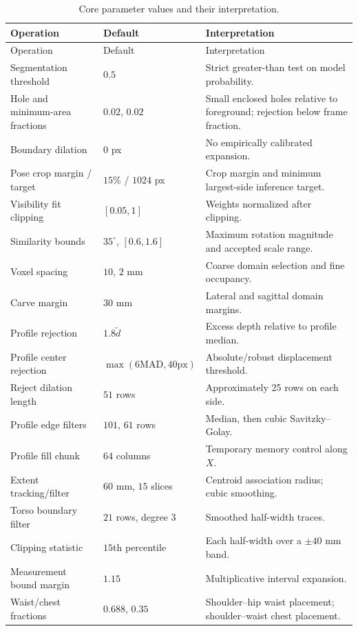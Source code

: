 \begin{longtable}{p{4.7cm}p{3.1cm}p{6.9cm}}
\caption{Core parameter values and their interpretation.}\label{tab:parameters}\\
\toprule
Operation & Default & Interpretation \\
\midrule
\endfirsthead
\toprule Operation & Default & Interpretation \\
\midrule
\endhead
\bottomrule\endfoot
Segmentation threshold & $0.5$ & Strict greater-than test on model probability. \\
Hole and minimum-area fractions & $0.02$, $0.02$ & Small enclosed holes relative to foreground; rejection below frame fraction. \\
Boundary dilation & $0$ px & No empirically calibrated expansion. \\
Pose crop margin / target & $15\%$ / $1024$ px & Crop margin and minimum largest-side inference target. \\
Visibility fit clipping & $[0.05,1]$ & Weights normalized after clipping. \\
Similarity bounds & $35^\circ$, $[0.6,1.6]$ & Maximum rotation magnitude and accepted scale range. \\
Voxel spacing & $10$, $2$ mm & Coarse domain selection and fine occupancy. \\
Carve margin & $30$ mm & Lateral and sagittal domain margins. \\
Profile rejection & $1.8\widetilde d$ & Excess depth relative to profile median. \\
Profile center rejection & $\max(6\mathrm{MAD},40\mathrm{px})$ & Absolute/robust displacement threshold. \\
Reject dilation length & $51$ rows & Approximately 25 rows on each side. \\
Profile edge filters & $101$, $61$ rows & Median, then cubic Savitzky--Golay. \\
Profile fill chunk & $64$ columns & Temporary memory control along $X$. \\
Extent tracking/filter & $60$ mm, $15$ slices & Centroid association radius; cubic smoothing. \\
Torso boundary filter & $21$ rows, degree 3 & Smoothed half-width traces. \\
Clipping statistic & $15$th percentile & Each half-width over a $\pm40$ mm band. \\
Measurement bound margin & $1.15$ & Multiplicative interval expansion. \\
Waist/chest fractions & $0.688$, $0.35$ & Shoulder--hip waist placement; shoulder--waist chest placement. \\

\end{longtable}
